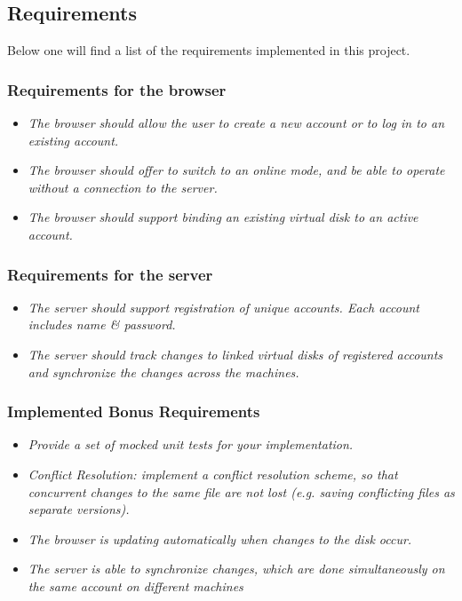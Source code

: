 \subsection{Requirements}
Below one will find a list of the requirements implemented in this project.

\subsubsection {Requirements for the browser}
\begin{itemize}
  \item \emph{The browser should allow the user to create a new account or to log in to an existing account.}
  \item \emph{The browser should offer to switch to an online mode, and be able
  to operate without a connection to the server. }
  \item \emph{The browser should support binding an existing virtual disk to an active account.}
\end{itemize}  


\subsubsection {Requirements for the server}
\begin{itemize}
  \item \emph{The server should support registration of unique accounts. Each
  account includes name \& password.}
  \item \emph{The server should track changes to linked virtual disks of registered accounts and synchronize the
changes across the machines.}
\end{itemize}  


\subsubsection {Implemented Bonus Requirements}
\begin{itemize}
  \item \emph{Provide a set of mocked unit tests for your implementation.}

  \item \emph{Conflict Resolution: implement a conflict resolution scheme, so
  that concurrent changes to the same file are not lost (e.g. saving conflicting
  files as separate versions).}
  \item \emph{The browser is updating automatically when changes to the disk
  occur.}
  \item \emph{The server is able to synchronize changes, which are done
  simultaneously on the same account on different machines}
 
\end{itemize}

